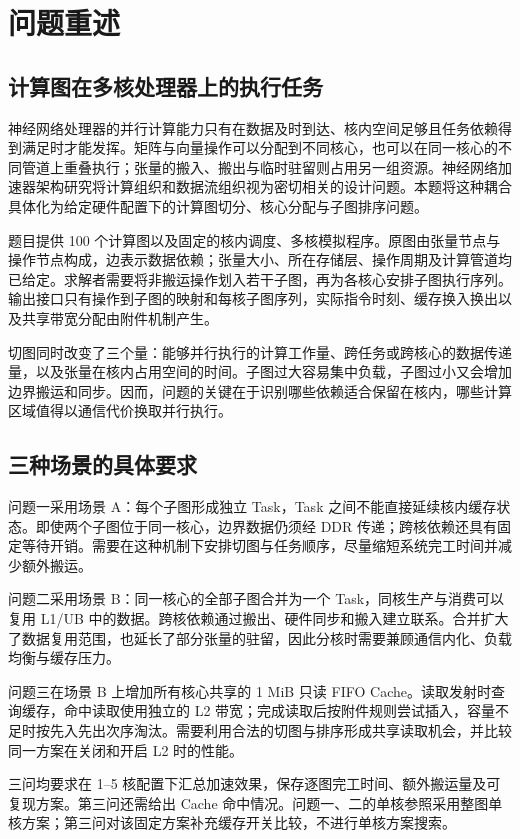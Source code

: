 \section{问题重述}

\subsection{计算图在多核处理器上的执行任务}
神经网络处理器的并行计算能力只有在数据及时到达、核内空间足够且任务依赖得到满足时才能发挥。矩阵与向量操作可以分配到不同核心，也可以在同一核心的不同管道上重叠执行；张量的搬入、搬出与临时驻留则占用另一组资源。神经网络加速器架构研究将计算组织和数据流组织视为密切相关的设计问题\cite{Chen2022}。本题将这种耦合具体化为给定硬件配置下的计算图切分、核心分配与子图排序问题。

题目提供 100 个计算图以及固定的核内调度、多核模拟程序。原图由张量节点与操作节点构成，边表示数据依赖；张量大小、所在存储层、操作周期及计算管道均已给定。求解者需要将非搬运操作划入若干子图，再为各核心安排子图执行序列。输出接口只有操作到子图的映射和每核子图序列，实际指令时刻、缓存换入换出以及共享带宽分配由附件机制产生\cite{Problem2026}。

切图同时改变了三个量：能够并行执行的计算工作量、跨任务或跨核心的数据传递量，以及张量在核内占用空间的时间。子图过大容易集中负载，子图过小又会增加边界搬运和同步。因而，问题的关键在于识别哪些依赖适合保留在核内，哪些计算区域值得以通信代价换取并行执行。

\subsection{三种场景的具体要求}
问题一采用场景 A：每个子图形成独立 Task，Task 之间不能直接延续核内缓存状态。即使两个子图位于同一核心，边界数据仍须经 DDR 传递；跨核依赖还具有固定等待开销。需要在这种机制下安排切图与任务顺序，尽量缩短系统完工时间并减少额外搬运。

问题二采用场景 B：同一核心的全部子图合并为一个 Task，同核生产与消费可以复用 L1/UB 中的数据。跨核依赖通过搬出、硬件同步和搬入建立联系。合并扩大了数据复用范围，也延长了部分张量的驻留，因此分核时需要兼顾通信内化、负载均衡与缓存压力。

问题三在场景 B 上增加所有核心共享的 1 MiB 只读 FIFO Cache。读取发射时查询缓存，命中读取使用独立的 L2 带宽；完成读取后按附件规则尝试插入，容量不足时按先入先出次序淘汰。需要利用合法的切图与排序形成共享读取机会，并比较同一方案在关闭和开启 L2 时的性能。

三问均要求在 1--5 核配置下汇总加速效果，保存逐图完工时间、额外搬运量及可复现方案。第三问还需给出 Cache 命中情况。问题一、二的单核参照采用整图单核方案；第三问对该固定方案补充缓存开关比较，不进行单核方案搜索。
